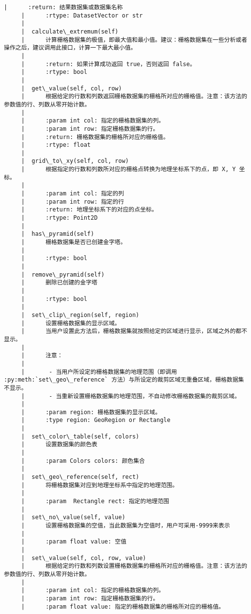 \documentclass[11pt]{article}
\begin{document}
\begin{Verbatim}[commandchars=\\\{\}]
     |      :return: 结果数据集或数据集名称
     |      :rtype: DatasetVector or str
     |  
     |  calculate\_extremum(self)
     |      计算栅格数据集的极值，即最大值和最小值。建议：栅格数据集在一些分析或者操作之后，建议调用此接口，计算一下最大最小值。
     |      
     |      :return: 如果计算成功返回 true，否则返回 false。
     |      :rtype: bool
     |  
     |  get\_value(self, col, row)
     |      根据给定的行数和列数返回栅格数据集的栅格所对应的栅格值。注意：该方法的参数值的行、列数从零开始计数。
     |      
     |      :param int col: 指定的栅格数据集的列。
     |      :param int row: 指定栅格数据集的行。
     |      :return: 栅格数据集的栅格所对应的栅格值。
     |      :rtype: float
     |  
     |  grid\_to\_xy(self, col, row)
     |      根据指定的行数和列数所对应的栅格点转换为地理坐标系下的点，即 X, Y 坐标。
     |      
     |      :param int col: 指定的列
     |      :param int row: 指定的行
     |      :return: 地理坐标系下的对应的点坐标。
     |      :rtype: Point2D
     |  
     |  has\_pyramid(self)
     |      栅格数据集是否已创建金字塔。
     |      
     |      :rtype: bool
     |  
     |  remove\_pyramid(self)
     |      删除已创建的金字塔
     |      
     |      :rtype: bool
     |  
     |  set\_clip\_region(self, region)
     |      设置栅格数据集的显示区域。
     |      当用户设置此方法后，栅格数据集就按照给定的区域进行显示，区域之外的都不显示。
     |      
     |      注意：
     |      
     |       - 当用户所设定的栅格数据集的地理范围（即调用 :py:meth:`set\_geo\_reference` 方法）与所设定的裁剪区域无重叠区域，栅格数据集不显示。
     |       - 当重新设置栅格数据集的地理范围，不自动修改栅格数据集的裁剪区域。
     |      
     |      :param region: 栅格数据集的显示区域。
     |      :type region: GeoRegion or Rectangle
     |  
     |  set\_color\_table(self, colors)
     |      设置数据集的颜色表
     |      
     |      :param Colors colors: 颜色集合
     |  
     |  set\_geo\_reference(self, rect)
     |      将栅格数据集对应到地理坐标系中指定的地理范围。
     |      
     |      :param  Rectangle rect: 指定的地理范围
     |  
     |  set\_no\_value(self, value)
     |      设置栅格数据集的空值，当此数据集为空值时，用户可采用-9999来表示
     |      
     |      :param float value: 空值
     |  
     |  set\_value(self, col, row, value)
     |      根据给定的行数和列数设置栅格数据集的栅格所对应的栅格值。注意：该方法的参数值的行、列数从零开始计数。
     |      
     |      :param int col: 指定的栅格数据集的列。
     |      :param int row: 指定栅格数据集的行。
     |      :param float value: 指定的栅格数据集的栅格所对应的栅格值。

\end{Verbatim}
\end{document}
